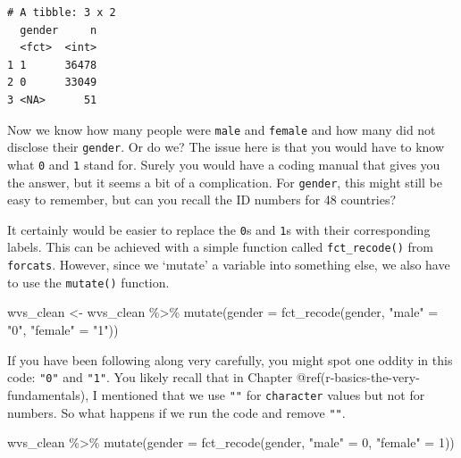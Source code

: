 \documentclass[
  letterpaper,
]{krantz}
\makeatletter
\newenvironment{Shaded}{\begin{snugshade}}{\end{snugshade}}
\newcommand{\AttributeTok}[1]{\textcolor[rgb]{0.40,0.45,0.13}{#1}}
\newcommand{\DecValTok}[1]{\textcolor[rgb]{0.68,0.00,0.00}{#1}}
\newcommand{\FunctionTok}[1]{\textcolor[rgb]{0.28,0.35,0.67}{#1}}
\newcommand{\NormalTok}[1]{\textcolor[rgb]{0.00,0.23,0.31}{#1}}
\newcommand{\OtherTok}[1]{\textcolor[rgb]{0.00,0.23,0.31}{#1}}
\newcommand{\SpecialCharTok}[1]{\textcolor[rgb]{0.37,0.37,0.37}{#1}}
\newcommand{\StringTok}[1]{\textcolor[rgb]{0.13,0.47,0.30}{#1}}
\newenvironment{kframe}{%
\medskip{}
\setlength{\fboxsep}{.8em}
 \def\at@end@of@kframe{}%
 \ifinner\ifhmode%
  \def\at@end@of@kframe{\end{minipage}}%
  \begin{minipage}{\columnwidth}%
 \fi\fi%
 \def\FrameCommand##1{\hskip\@totalleftmargin \hskip-\fboxsep
 \colorbox{shadecolor}{##1}\hskip-\fboxsep
     \hskip-\linewidth \hskip-\@totalleftmargin \hskip\columnwidth}%
 \MakeFramed {\advance\hsize-\width
   \@totalleftmargin\z@ \linewidth\hsize
   \@setminipage}}%
 {\par\unskip\endMakeFramed%
 \at@end@of@kframe}
\renewenvironment{Shaded}{\begin{kframe}}{\end{kframe}}
\makeatother
\begin{document}
\begin{verbatim}
# A tibble: 3 x 2
  gender     n
  <fct>  <int>
1 1      36478
2 0      33049
3 <NA>      51
\end{verbatim}

Now we know how many people were \texttt{male} and \texttt{female} and
how many did not disclose their \texttt{gender}. Or do we? The issue
here is that you would have to know what \texttt{0} and \texttt{1} stand
for. Surely you would have a coding manual that gives you the answer,
but it seems a bit of a complication. For \texttt{gender}, this might
still be easy to remember, but can you recall the ID numbers for 48
countries?

It certainly would be easier to replace the \texttt{0}s and \texttt{1}s
with their corresponding labels. This can be achieved with a simple
function called \texttt{fct\_recode()} from \texttt{forcats}. However,
since we `mutate' a variable into something else, we also have to use
the \texttt{mutate()} function.

\begin{Shaded}
\begin{Highlighting}[]
\NormalTok{wvs\_clean }\OtherTok{\textless{}{-}}
\NormalTok{  wvs\_clean }\SpecialCharTok{\%\textgreater{}\%}
  \FunctionTok{mutate}\NormalTok{(}\AttributeTok{gender =} \FunctionTok{fct\_recode}\NormalTok{(gender,}
                             \StringTok{"male"} \OtherTok{=} \StringTok{"0"}\NormalTok{,}
                             \StringTok{"female"} \OtherTok{=} \StringTok{"1"}\NormalTok{))}
\end{Highlighting}
\end{Shaded}

If you have been following along very carefully, you might spot one
oddity in this code: \texttt{"0"} and \texttt{"1"}. You likely recall
that in Chapter @ref(r-basics-the-very-fundamentals), I mentioned that
we use \texttt{""} for \texttt{character} values but not for numbers. So
what happens if we run the code and remove \texttt{""}.

\begin{Shaded}
\begin{Highlighting}[]
\NormalTok{wvs\_clean }\SpecialCharTok{\%\textgreater{}\%}
  \FunctionTok{mutate}\NormalTok{(}\AttributeTok{gender =} \FunctionTok{fct\_recode}\NormalTok{(gender,}
                             \StringTok{"male"} \OtherTok{=} \DecValTok{0}\NormalTok{,}
                             \StringTok{"female"} \OtherTok{=} \DecValTok{1}\NormalTok{))}
\end{Highlighting}
\end{Shaded}
\end{document}
